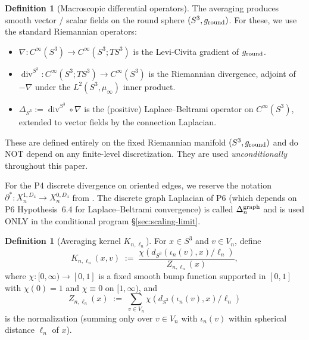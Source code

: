 \documentclass[11pt, a4paper]{amsart}
\theoremstyle{definition}
\newtheorem{definition}[theorem]{Definition}
\newcommand{\dsph}{d_{S^3}}
\begin{document}
\begin{definition}[Macroscopic differential operators]
\label{def:macro-ops}
The averaging produces smooth vector / scalar fields on the
round sphere $(S^3, g_{\rm round})$. For these, we use the
standard Riemannian operators:
\begin{itemize}
\item $\nabla \colon C^\infty(S^3) \to C^\infty(S^3; TS^3)$ is
  the Levi-Civita gradient of $g_{\rm round}$.
\item $\operatorname{div}^{S^3} \colon C^\infty(S^3; TS^3) \to
  C^\infty(S^3)$ is the Riemannian divergence, adjoint of
  $-\nabla$ under the $L^2(S^3, \mu_\infty)$ inner product.
\item $\Delta_{S^3} := \operatorname{div}^{S^3} \circ \nabla$ is
  the (positive) Laplace--Beltrami operator on $C^\infty(S^3)$,
  extended to vector fields by the connection Laplacian.
\end{itemize}
These are defined entirely on the fixed Riemannian manifold
$(S^3, g_{\rm round})$ and do NOT depend on any finite-level
discretization. They are used \emph{unconditionally} throughout
this paper.

For the P4 discrete divergence on oriented edges, we reserve the
notation $\partial^\ast \colon X_n^{1, D_4} \to X_n^{0, D_4}$
from \cite[Def.~3.3]{ClosureDynamics}. The discrete graph
Laplacian of P6 (which depends on P6 Hypothesis~6.4 for
Laplace--Beltrami convergence) is called $\Delta^{\rm
graph}_n$ and is used ONLY in the conditional program
\S\ref{sec:scaling-limit}.
\end{definition}

\begin{definition}[Averaging kernel $K_{n, \ell_n}$]
\label{def:kernel}
For $x \in S^3$ and $v \in V_n$, define
\[
  K_{n, \ell_n}(x, v) \;:=\;
    \frac{\chi(\dsph(\iota_n(v), x)/\ell_n)}{Z_{n, \ell_n}(x)},
\]
where $\chi \colon [0, \infty) \to [0, 1]$ is a fixed smooth
bump function supported in $[0, 1]$ with $\chi(0) = 1$ and
$\chi \equiv 0$ on $[1, \infty)$, and
\[
  Z_{n, \ell_n}(x) \;:=\; \sum_{v \in V_n}
    \chi(\dsph(\iota_n(v), x)/\ell_n)
\]
is the normalization (summing only over $v \in V_n$ with
$\iota_n(v)$ within spherical distance $\ell_n$ of $x$).
\end{definition}
\end{document}
